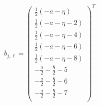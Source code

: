 \documentclass[11pt]{article}
\begin{document}
\begin{align*}
  b_{j,\ell} = 
  \left(
\begin{array}{c}
 \frac{1}{2} (-a-\eta ) \\
 \frac{1}{2} (-a-\eta -2) \\
 \frac{1}{2} (-a-\eta -4) \\
 \frac{1}{2} (-a-\eta -6) \\
 \frac{1}{2} (-a-\eta -8) \\
 -\frac{a}{2}-\frac{\eta }{2}-5 \\
 -\frac{a}{2}-\frac{\eta }{2}-6 \\
 -\frac{a}{2}-\frac{\eta }{2}-7 \\
\end{array}
\right)^T 
\end{align*}

\printbibliography[title={References}]
\end{document}
